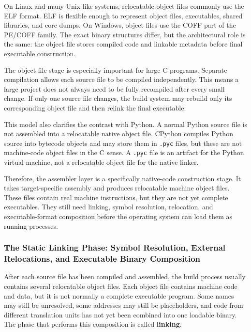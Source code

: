 On Linux and many Unix-like systems, relocatable object files commonly use the ELF format. ELF is flexible enough to represent object files, executables, shared libraries, and core dumps. On Windows, object files use the COFF part of the PE/COFF family. The exact binary structures differ, but the architectural role is the same: the object file stores compiled code and linkable metadata before final executable construction.

The object-file stage is especially important for large C programs. Separate compilation allows each source file to be compiled independently. This means a large project does not always need to be fully recompiled after every small change. If only one source file changes, the build system may rebuild only its corresponding object file and then relink the final executable.

This model also clarifies the contrast with Python. A normal Python source file is not assembled into a relocatable native object file. CPython compiles Python source into bytecode objects and may store them in \texttt{.pyc} files, but these are not machine-code object files in the C sense. A \texttt{.pyc} file is an artifact for the Python virtual machine, not a relocatable object file for the native linker.

Therefore, the assembler layer is a specifically native-code construction stage. It takes target-specific assembly and produces relocatable machine object files. These files contain real machine instructions, but they are not yet complete executables. They still need linking, symbol resolution, relocation, and executable-format composition before the operating system can load them as running processes.


\subsubsection{The Static Linking Phase: Symbol Resolution, External Relocations, and Executable Binary Composition}

After each source file has been compiled and assembled, the build process usually contains several relocatable object files. Each object file contains machine code and data, but it is not normally a complete executable program. Some names may still be unresolved, some addresses may still be placeholders, and code from different translation units has not yet been combined into one loadable binary. The phase that performs this composition is called \textbf{linking}.

